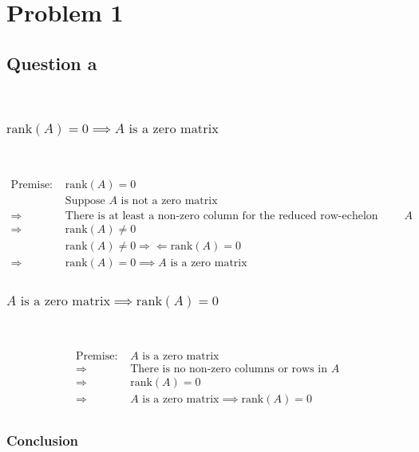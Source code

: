 \documentclass{article}
\def\rank{\text{rank}}
\begin{document}
\section{Problem 1}

\subsection{Question a}

~

\subsubsection{$\rank(A)=0\implies A\text{ is a zero matrix}$}

~

\begin{equation*}
\begin{split}
\text{Premise: }&\rank(A)=0\\
&\text{Suppose }A\text{ is not a zero matrix}\\
\Rightarrow &\text{There is at least a non-zero column for the reduced row-echelon form of }A\\
\Rightarrow &\rank(A)\ne0\\
&\rank(A)\ne0\Rightarrow\!\Leftarrow\rank(A)=0\\
\Rightarrow &\rank(A)=0\implies A\text{ is a zero matrix}\\
\end{split}
\end{equation*}

\subsubsection{$A\text{ is a zero matrix}\implies\rank(A)=0$}

~

\begin{equation*}
\begin{split}
\text{Premise: }&A\text{ is a zero matrix}\\
\Rightarrow&\text{There is no non-zero columns or rows in }A\\
\Rightarrow&\rank(A)=0\\
\Rightarrow&A\text{ is a zero matrix}\implies\rank(A)=0\\
\end{split}
\end{equation*}

\subsubsection{Conclusion}
\end{document}
